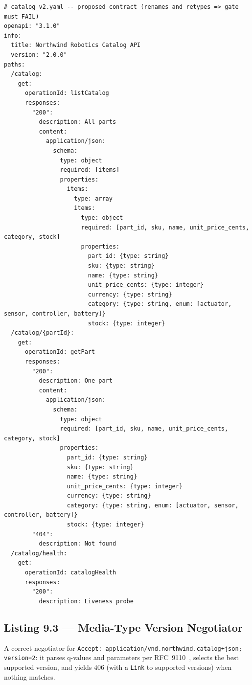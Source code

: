 \begin{verbatim}
# catalog_v2.yaml -- proposed contract (renames and retypes => gate must FAIL)
openapi: "3.1.0"
info:
  title: Northwind Robotics Catalog API
  version: "2.0.0"
paths:
  /catalog:
    get:
      operationId: listCatalog
      responses:
        "200":
          description: All parts
          content:
            application/json:
              schema:
                type: object
                required: [items]
                properties:
                  items:
                    type: array
                    items:
                      type: object
                      required: [part_id, sku, name, unit_price_cents, category, stock]
                      properties:
                        part_id: {type: string}
                        sku: {type: string}
                        name: {type: string}
                        unit_price_cents: {type: integer}
                        currency: {type: string}
                        category: {type: string, enum: [actuator, sensor, controller, battery]}
                        stock: {type: integer}
  /catalog/{partId}:
    get:
      operationId: getPart
      responses:
        "200":
          description: One part
          content:
            application/json:
              schema:
                type: object
                required: [part_id, sku, name, unit_price_cents, category, stock]
                properties:
                  part_id: {type: string}
                  sku: {type: string}
                  name: {type: string}
                  unit_price_cents: {type: integer}
                  currency: {type: string}
                  category: {type: string, enum: [actuator, sensor, controller, battery]}
                  stock: {type: integer}
        "404":
          description: Not found
  /catalog/health:
    get:
      operationId: catalogHealth
      responses:
        "200":
          description: Liveness probe
\end{verbatim}

\subsection{Listing 9.3 --- Media-Type Version Negotiator}
\label{subsec:ch9-listing3}

A correct negotiator for
\texttt{Accept: application/vnd.northwind.catalog+json; version=2}: it parses
q-values and parameters per RFC~9110~\cite{rfc9110}, selects the best
supported version, and yields 406 (with a \texttt{Link} to supported
versions) when nothing matches.

